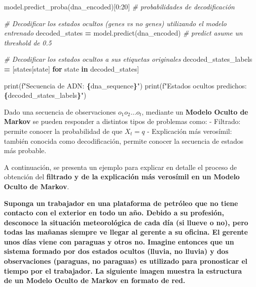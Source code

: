 \documentclass[
  a4paper,
  DIV=11,
  numbers=noendperiod]{scrreprt}
\newenvironment{Shaded}{\begin{snugshade}}{\end{snugshade}}
\newcommand{\BuiltInTok}[1]{#1}
\newcommand{\CommentTok}[1]{\textcolor[rgb]{0.56,0.35,0.01}{\textit{#1}}}
\newcommand{\ControlFlowTok}[1]{\textcolor[rgb]{0.13,0.29,0.53}{\textbf{#1}}}
\newcommand{\DecValTok}[1]{\textcolor[rgb]{0.00,0.00,0.81}{#1}}
\newcommand{\KeywordTok}[1]{\textcolor[rgb]{0.13,0.29,0.53}{\textbf{#1}}}
\newcommand{\NormalTok}[1]{#1}
\newcommand{\OperatorTok}[1]{\textcolor[rgb]{0.81,0.36,0.00}{\textbf{#1}}}
\newcommand{\SpecialCharTok}[1]{\textcolor[rgb]{0.81,0.36,0.00}{\textbf{#1}}}
\newcommand{\SpecialStringTok}[1]{\textcolor[rgb]{0.31,0.60,0.02}{#1}}
\begin{document}
\begin{Shaded}
\begin{Highlighting}[numbers=left,,]
\NormalTok{model.predict\_proba(dna\_encoded)[}\DecValTok{0}\NormalTok{:}\DecValTok{20}\NormalTok{] }\CommentTok{\# probabilidades de decodificación}
\end{Highlighting}
\end{Shaded}

\begin{Shaded}
\begin{Highlighting}[numbers=left,,]
\CommentTok{\# Decodificar los estados ocultos (genes vs no genes) utilizando el modelo entrenado}
\NormalTok{decoded\_states }\OperatorTok{=}\NormalTok{ model.predict(dna\_encoded) }\CommentTok{\# predict asume un threshold de 0.5}

\CommentTok{\# Decodificar los estados ocultos a sus etiquetas originales}
\NormalTok{decoded\_states\_labels }\OperatorTok{=}\NormalTok{ [states[state] }\ControlFlowTok{for}\NormalTok{ state }\KeywordTok{in}\NormalTok{ decoded\_states]}

\BuiltInTok{print}\NormalTok{(}\SpecialStringTok{f"Secuencia de ADN: }\SpecialCharTok{\{}\NormalTok{dna\_sequence}\SpecialCharTok{\}}\SpecialStringTok{"}\NormalTok{)}
\BuiltInTok{print}\NormalTok{(}\SpecialStringTok{f"Estados ocultos predichos: }\SpecialCharTok{\{}\NormalTok{decoded\_states\_labels}\SpecialCharTok{\}}\SpecialStringTok{"}\NormalTok{)}
\end{Highlighting}
\end{Shaded}

Dado una secuencia de observaciones \(o_1 o_2 … o_t\), mediante un
\textbf{Modelo Oculto de Markov} se pueden responder a distintos tipos
de problemas como: - Filtrado: permite conocer la probabilidad de que
\(X_t=q\) - Explicación más verosímil: también conocida como
decodificación, permite conocer la secuencia de estados más probable.

A continuación, se presenta un ejemplo para explicar en detalle el
proceso de obtención del \textbf{filtrado y de la explicación más
verosímil en un Modelo Oculto de Markov}.

\textbf{Suponga un trabajador en una plataforma de petróleo que no tiene
contacto con el exterior en todo un año. Debido a su profesión,
desconoce la situación meteorológica de cada día (si llueve o no), pero
todas las mañanas siempre ve llegar al gerente a su oficina. El gerente
unos días viene con paraguas y otros no. Imagine entonces que un sistema
formado por dos estados ocultos (lluvia, no lluvia) y dos observaciones
(paraguas, no paraguas) es utilizado para pronosticar el tiempo por el
trabajador. La siguiente imagen muestra la estructura de un Modelo
Oculto de Markov en formato de red.}
\end{document}
